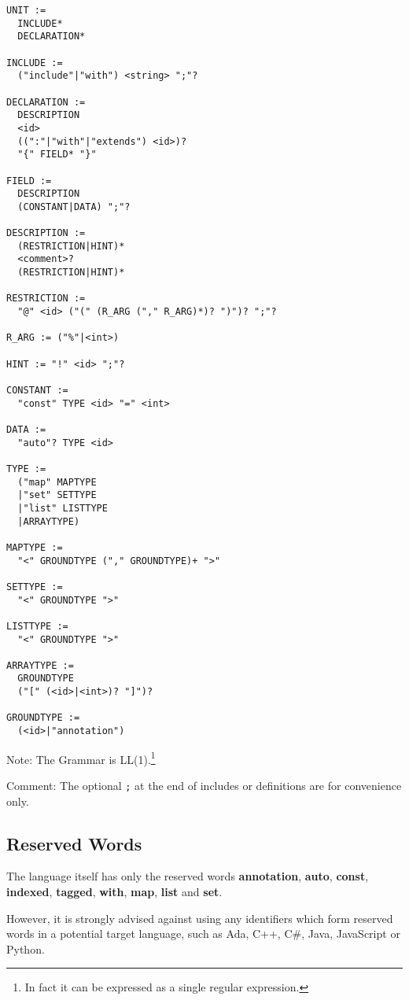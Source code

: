 \documentclass[a4paper,10pt]{article}
\begin{document}
\begin{verbatim}
UNIT :=
  INCLUDE*
  DECLARATION*

INCLUDE := 
  ("include"|"with") <string> ";"?

DECLARATION :=
  DESCRIPTION
  <id>
  ((":"|"with"|"extends") <id>)?
  "{" FIELD* "}"
  
FIELD :=
  DESCRIPTION
  (CONSTANT|DATA) ";"?
  
DESCRIPTION := 
  (RESTRICTION|HINT)*
  <comment>?
  (RESTRICTION|HINT)*
  
RESTRICTION :=
  "@" <id> ("(" (R_ARG ("," R_ARG)*)? ")")? ";"?
  
R_ARG := ("%"|<int>)

HINT := "!" <id> ";"?
  
CONSTANT :=
  "const" TYPE <id> "=" <int>
  
DATA :=
  "auto"? TYPE <id>
  
TYPE :=
  ("map" MAPTYPE
  |"set" SETTYPE
  |"list" LISTTYPE
  |ARRAYTYPE)
  
MAPTYPE :=
  "<" GROUNDTYPE ("," GROUNDTYPE)+ ">"
  
SETTYPE :=
  "<" GROUNDTYPE ">"
  
LISTTYPE :=
  "<" GROUNDTYPE ">"
  
ARRAYTYPE :=
  GROUNDTYPE
  ("[" (<id>|<int>)? "]")?
  
GROUNDTYPE :=
  (<id>|"annotation")

\end{verbatim}
Note: The Grammar is LL(1).\footnote{In fact it can be expressed as a single regular expression.}

Comment: The optional \texttt{;} at the end of includes or definitions are for convenience only.

\subsection{Reserved Words}

The language itself has only the reserved words \textbf{annotation}, \textbf{auto}, \textbf{const}, \textbf{indexed}, \textbf{tagged}, \textbf{with}, \textbf{map}, \textbf{list} and \textbf{set}.

However, it is strongly advised against using any identifiers which form reserved words in a potential target language, such as Ada, C++, C\#, Java, JavaScript or Python.
\end{document}
